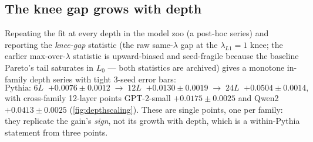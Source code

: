 \subsection{The knee gap grows with depth}
\label{sec:evaluation:depth}

Repeating the fit at every depth in the model zoo (a post-hoc series) and
reporting the \emph{knee-gap} statistic (the raw same-$\lambda$ gap at the $\lambda_{L1}=1$
knee; the earlier max-over-$\lambda$ statistic is upward-biased and
seed-fragile because the baseline Pareto's tail saturates in $L_0$ --- both
statistics are archived) gives a monotone in-family depth series with tight
3-seed error bars:
\[
  \text{Pythia: } 6L\;\; {+0.0076 \pm 0.0012} \;\to\;
  12L\;\; {+0.0130 \pm 0.0019} \;\to\;
  24L\;\; {+0.0504 \pm 0.0014},
\]
with cross-family 12-layer points GPT-2-small $+0.0175 \pm 0.0025$ and Qwen2
$+0.0413 \pm 0.0025$ (\cref{fig:depthscaling}). These are single points, one
per family: they replicate the gain's \emph{sign}, not its growth with depth,
which is a within-Pythia statement from three points.

